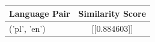 \begin{tabular}{|l|c|}
\hline
Language Pair & Similarity Score \\
\hline
('pl', 'en') & [[0.884603]] \\
\hline
\end{tabular}

